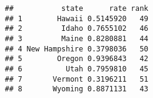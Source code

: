 \documentclass[
]{article}
\begin{document}
\begin{verbatim}
##           state      rate rank
## 1        Hawaii 0.5145920   49
## 2         Idaho 0.7655102   46
## 3         Maine 0.8280881   44
## 4 New Hampshire 0.3798036   50
## 5        Oregon 0.9396843   42
## 6          Utah 0.7959810   45
## 7       Vermont 0.3196211   51
## 8       Wyoming 0.8871131   43
\end{verbatim}
\end{document}
